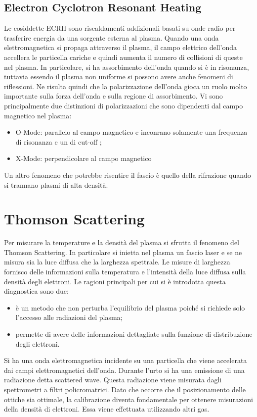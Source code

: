 \documentclass{article}
\begin{document}
\subsection{Electron Cyclotron Resonant Heating}
Le cosiddette ECRH sono riscaldamenti addizionali basati su onde radio per trasferire energia da una sorgente esterna al plasma. Quando una onda elettromagnetica si propaga attraverso il plasma, il campo elettrico dell'onda accellera le particella cariche e quindi aumenta il numero di collisioni di queste nel plasma.\newline
In particolare, si ha assorbimento dell'onda quando si è in risonanza, tuttavia essendo il plasma non uniforme si possono avere anche fenomeni di riflessioni. Ne risulta quindi che la polarizzazione dell'onda gioca un ruolo molto importante sulla forza dell'onda e sulla regione di assorbimento. Vi sono principalmente due distinzioni di polarizzazioni che sono dipendenti dal campo magnetico nel plasma:\begin{itemize}
    \item O-Mode: parallelo al campo magnetico e inconrano solamente una frequenza di risonanza e un di cut-off ;
    \item X-Mode: perpendicolare al campo magnetico
\end{itemize}
Un altro fenomeno che potrebbe risentire il fascio è quello della rifrazione quando si trannano plasmi di alta densità.
\section{Thomson Scattering}
Per misurare la temperature e la densità del plasma si sfrutta il fenomeno del Thomson Scattering. In particolare si inietta nel plasma un fascio laser e se ne misura sia la luce diffusa che la larghezza spettrale.\newline
Le misure di larghezza fornisco delle informazioni sulla temperatura e l'intensità della luce diffusa sulla densità degli elettroni. Le ragioni principali per cui si è introdotta questa diagnostica sono due:\begin{itemize}
    \item è un metodo che non perturba l'equilibrio del plasma poiché si richiede solo l'accesso alle radiazioni del plasma;
    \item permette di avere delle informazioni dettagliate sulla funzione di distribuzione degli elettroni.
\end{itemize}
Si ha una onda elettromagnetica incidente su una particella che viene accelerata dai campi elettromagnetici dell'onda. Durante l'urto si ha una emissione di una radiazione detta scattered wave. Questa radiazione viene misurata dagli spettrometri a filtri policromatrici.
Dato che occorre che il posizionamento delle ottiche sia ottimale, la calibrazione diventa fondamentale per ottenere misurazioni della densità di elettroni. Essa viene effettuata utilizzando altri gas.
\end{document}
